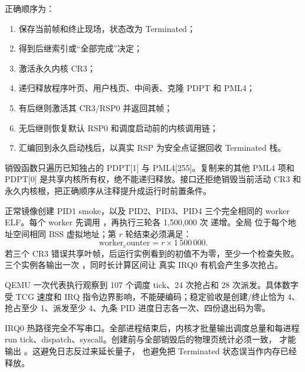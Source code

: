 正确顺序为：

\begin{enumerate}[label=\arabic*.]
  \item 保存当前帧和终止现场，状态改为 Terminated；
  \item 得到后继索引或“全部完成”决定；
  \item 激活永久内核 CR3；
  \item 递归释放程序叶页、用户栈页、中间表、克隆 PDPT 和 PML4；
  \item 有后继则激活其 CR3/RSP0 并返回其帧；
  \item 无后继则恢复默认 RSP0 和调度启动前的内核调用链；
  \item 汇编回到永久启动栈后，以真实 RSP 为安全点证据回收 Terminated 栈。
\end{enumerate}

销毁函数只遍历已知独占的 PDPT[1] 与 PML4[255]。复制来的其他 PML4 项和
PDPT[0] 是共享内核所有权，绝不能递归释放。接口还拒绝销毁当前活动 CR3 和
永久内核根，把正确顺序从注释提升成运行时前置条件。

正常镜像创建 PID1 smoke，以及 PID2、PID3、PID4 三个完全相同的 worker
ELF。每个 worker 先调用 ，再执行三轮各 1,500,000 次
递增。全局  位于每个地址空间相同 BSS 虚拟地址；第
\(r\) 轮结束必须满足：
\[
  \mathrm{worker_counter}=r\times1\,500\,000.
\]
若三个 CR3 错误共享叶帧，后运行实例看到的初值不为零，至少一个检查失败。
三个实例各输出一次 ，同时长计算区间让
真实 IRQ0 有机会产生多次抢占。

QEMU 一次代表执行观察到 107 个调度 tick、24 次抢占和 28 次派发。具体数字
受 TCG 速度和 IRQ 指令边界影响，不能硬编码；稳定验收是创建/终止恰为 4、
抢占至少 1、派发至少 4、九条 PID 进度日志各一次、四份退出码为零。

IRQ0 热路径完全不写串口。全部进程结束后，内核才批量输出调度总量和每进程
run tick、dispatch、syscall。创建前与全部销毁后的物理页统计必须一致，
才能输出 。这避免日志反过来延长量子，
也避免把 Terminated 状态误当作内存已经释放。
